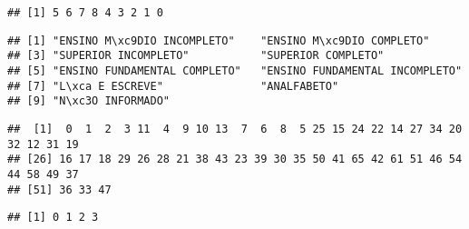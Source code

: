 \documentclass[
]{article}
\newenvironment{Shaded}{\begin{snugshade}}{\end{snugshade}}
\newcommand{\CommentTok}[1]{\textcolor[rgb]{0.56,0.35,0.01}{\textit{#1}}}
\newcommand{\FunctionTok}[1]{\textcolor[rgb]{0.13,0.29,0.53}{\textbf{#1}}}
\newcommand{\NormalTok}[1]{#1}
\newcommand{\SpecialCharTok}[1]{\textcolor[rgb]{0.81,0.36,0.00}{\textbf{#1}}}
\begin{document}
\begin{Shaded}
\end{Shaded}

\begin{verbatim}
## [1] 5 6 7 8 4 3 2 1 0
\end{verbatim}

\begin{Shaded}
\end{Shaded}

\begin{verbatim}
## [1] "ENSINO M\xc9DIO INCOMPLETO"    "ENSINO M\xc9DIO COMPLETO"     
## [3] "SUPERIOR INCOMPLETO"           "SUPERIOR COMPLETO"            
## [5] "ENSINO FUNDAMENTAL COMPLETO"   "ENSINO FUNDAMENTAL INCOMPLETO"
## [7] "L\xca E ESCREVE"               "ANALFABETO"                   
## [9] "N\xc3O INFORMADO"
\end{verbatim}

\begin{Shaded}
\end{Shaded}

\begin{verbatim}
##  [1]  0  1  2  3 11  4  9 10 13  7  6  8  5 25 15 24 22 14 27 34 20 32 12 31 19
## [26] 16 17 18 29 26 28 21 38 43 23 39 30 35 50 41 65 42 61 51 46 54 44 58 49 37
## [51] 36 33 47
\end{verbatim}

\begin{Shaded}
\end{Shaded}

\begin{verbatim}
## [1] 0 1 2 3
\end{verbatim}
\end{document}
